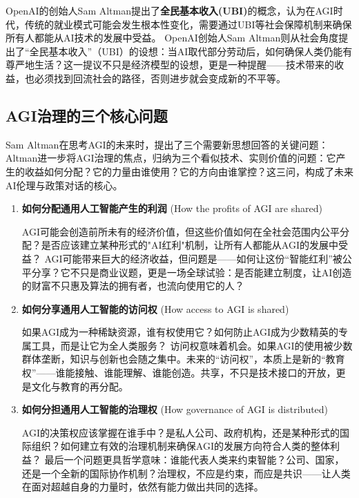 OpenAI的创始人Sam Altman提出了{\bf 全民基本收入(UBI)}的概念，认为在AGI时代，传统的就业模式可能会发生根本性变化，需要通过UBI等社会保障机制来确保所有人都能从AI技术的发展中受益。
OpenAI创始人Sam Altman则从社会角度提出了“全民基本收入”（UBI）的设想：当AI取代部分劳动后，如何确保人类仍能有尊严地生活？这一提议不只是经济模型的设想，更是一种提醒——技术带来的收益，也必须找到回流社会的路径，否则进步就会变成新的不平等。

\subsection{AGI治理的三个核心问题}

Sam Altman在思考AGI的未来时，提出了三个需要新思想回答的关键问题：
Altman进一步将AGI治理的焦点，归纳为三个看似技术、实则价值的问题：它产生的收益如何分配？它的力量由谁使用？它的方向由谁掌控？这三问，构成了未来AI伦理与政策对话的核心。

\begin{enumerate}
\item {\bf 如何分配通用人工智能产生的利润} (How the profits of AGI are shared)

AGI可能会创造前所未有的经济价值，但这些价值如何在全社会范围内公平分配？是否应该建立某种形式的"AI红利"机制，让所有人都能从AGI的发展中受益？
AGI可能带来巨大的经济收益，但问题是——如何让这份“智能红利”被公平分享？它不只是商业议题，更是一场全球试验：是否能建立制度，让AI创造的财富不只惠及算法的拥有者，也流向使用它的人？

\item {\bf 如何分享通用人工智能的访问权} (How access to AGI is shared)

如果AGI成为一种稀缺资源，谁有权使用它？如何防止AGI成为少数精英的专属工具，而是让它为全人类服务？
访问权意味着机会。如果AGI的使用被少数群体垄断，知识与创新也会随之集中。未来的“访问权”，本质上是新的“教育权”——谁能接触、谁能理解、谁能创造。共享，不只是技术接口的开放，更是文化与教育的再分配。

\item {\bf 如何分担通用人工智能的治理权} (How governance of AGI is distributed)

AGI的决策权应该掌握在谁手中？是私人公司、政府机构，还是某种形式的国际组织？如何建立有效的治理机制来确保AGI的发展方向符合人类的整体利益？
最后一个问题更具哲学意味：谁能代表人类来约束智能？公司、国家，还是一个全新的国际协作机制？治理权，不应是约束，而应是共识——让人类在面对超越自身的力量时，依然有能力做出共同的选择。
\end{enumerate}

